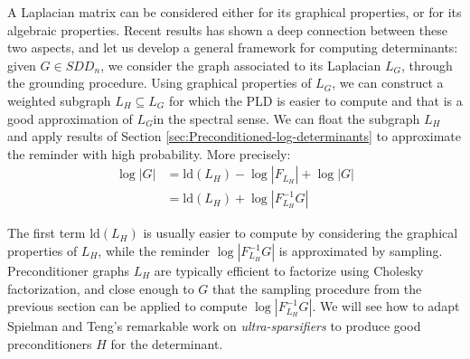 A Laplacian matrix can be considered either for its graphical properties,
or for its algebraic properties. Recent results has shown a deep connection
between these two aspects, and let us develop a general framework
for computing determinants: given $G\in SDD_{n}$, we consider the
graph associated to its Laplacian $L_{G}$, through the grounding
procedure. Using graphical properties of $L_{G}$, we can construct
a weighted subgraph $L_{H}\subseteq L_{G}$ for which the PLD is easier
to compute and that is a good approximation of $L_{G}$in the spectral
sense. We can float the subgraph $L_{H}$ and apply results of Section
\ref{sec:Preconditioned-log-determinants} to approximate the reminder
with high probability. More precisely:
\begin{align*}
\log\left|G\right| & =\text{ld}\left(L_{H}\right)-\log\left|F_{L_{H}}\right|+\log\left|G\right|\\
 & =\text{ld}\left(L_{H}\right)+\log\left|F_{L_{H}}^{-1}G\right|
\end{align*}


The first term $\text{ld}\left(L_{H}\right)$ is usually easier to
compute by considering the graphical properties of $L_{H}$, while
the reminder $\log\left|F_{L_{H}}^{-1}G\right|$ is approximated by
sampling. Preconditioner graphs $L_{H}$ are typically efficient to
factorize using Cholesky factorization, and close enough to $G$ that
the sampling procedure from the previous section can be applied to
compute $\log\left|F_{L_{H}}^{-1}G\right|$. We will see how to adapt
Spielman and Teng's remarkable work on \emph{ultra-sparsifiers} to
produce good preconditioners $H$ for the determinant. 
